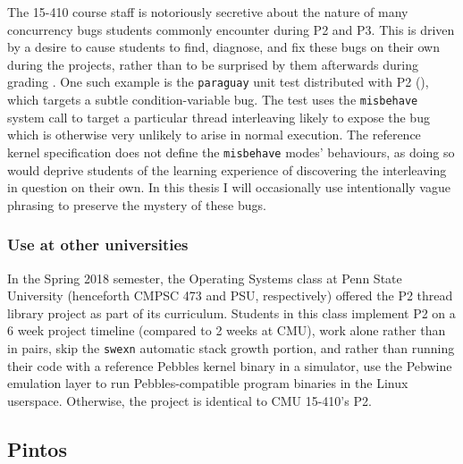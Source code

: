 The 15-410 course staff is notoriously secretive about the nature of many concurrency bugs
students commonly encounter during P2 and P3.
This is driven by a desire to cause students to find, diagnose, and fix these bugs on their own during the projects,
rather than to be surprised by them afterwards during grading
\cite{de0u-2018}.
%
One such example is the {\tt paraguay} unit test distributed with P2 (\sect{\ref{sec:education-pebbles-tests}}),
which targets a subtle condition-variable bug.
The test uses the {\tt misbehave} system call to target a particular thread interleaving likely to expose the bug
which is otherwise very unlikely to arise in normal execution.
The reference kernel specification \cite{kspec} does not define the {\tt misbehave} modes' behaviours,
as doing so would deprive students of the learning experience of discovering the interleaving in question on their own.
%
In this thesis I will occasionally use intentionally vague phrasing to preserve the mystery of these bugs.

\subsubsection{Use at other universities}
\label{sec:overview-psu}

\newcommand\psuos{CMPSC 473\xspace}

In the Spring 2018 semester,
the Operating Systems class at Penn State University (henceforth \psuos and PSU, respectively)
offered the P2 thread library project as part of its curriculum.
Students in this class implement P2
on a 6 week project timeline (compared to 2 weeks at CMU),
work alone rather than in pairs,
skip the {\tt swexn} automatic stack growth portion,
and rather than running their code with a reference Pebbles kernel binary in a simulator,
use the Pebwine emulation layer \cite{pebwine}
to run Pebbles-compatible program binaries in the Linux userspace.
Otherwise, the project is identical to CMU 15-410's P2.

\subsection{Pintos}
\label{sec:overview-pintos}

\newcommand\uchos{CMSC 23000\xspace}

